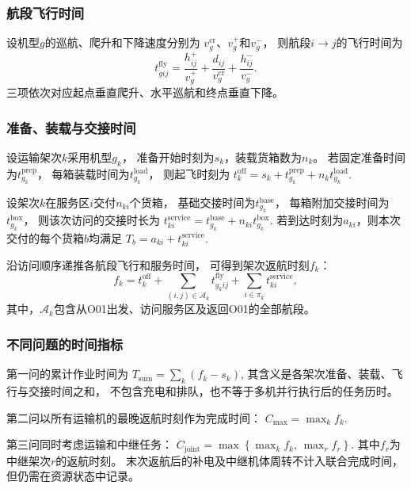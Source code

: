 \documentclass[bwprint]{gmcmthesis}
\begin{document}
\subsubsection{航段飞行时间}

设机型$g$的巡航、爬升和下降速度分别为
$v_g^{\mathrm{cr}}$、$v_g^{+}$和$v_g^{-}$，
则航段$i\to j$的飞行时间为
\begin{equation}
    t_{gij}^{\mathrm{fly}}
    =
    \frac{h_{ij}^{+}}{v_g^{+}}
    +
    \frac{d_{ij}}{v_g^{\mathrm{cr}}}
    +
    \frac{h_{ij}^{-}}{v_g^{-}}.
\end{equation}
三项依次对应起点垂直爬升、水平巡航和终点垂直下降。

\subsubsection{准备、装载与交接时间}

设运输架次$k$采用机型$g_k$，
准备开始时刻为$s_k$，装载货箱数为$n_k$。
若固定准备时间为$t_{g_k}^{\mathrm{prep}}$，
每箱装载时间为$t_{g_k}^{\mathrm{load}}$，
则起飞时刻为
\(t_k^{\mathrm{off}} = s_k+t_{g_k}^{\mathrm{prep}} +n_k t_{g_k}^{\mathrm{load}}\).

设架次$k$在服务区$i$交付$n_{ki}$个货箱，
基础交接时间为$t_{g_k}^{\mathrm{base}}$，
每箱附加交接时间为$t_{g_k}^{\mathrm{box}}$，
则该次访问的交接时长为
\(t_{ki}^{\mathrm{service}} = t_{g_k}^{\mathrm{base}} +n_{ki}t_{g_k}^{\mathrm{box}}\).
若到达时刻为$a_{ki}$，则本次交付的每个货箱$b$均满足
\(T_b = a_{ki}+t_{ki}^{\mathrm{service}}\).

沿访问顺序递推各航段飞行和服务时间，
可得到架次返航时刻$f_k$：
\begin{equation}
    f_k
    =
    t_k^{\mathrm{off}}
    +
    \sum_{(i,j)\in\mathcal{A}_k}
    t_{g_kij}^{\mathrm{fly}}
    +
    \sum_{i\in\pi_k}
    t_{ki}^{\mathrm{service}},
\end{equation}
其中，$\mathcal{A}_k$包含从O01出发、访问服务区及返回O01的全部航段。

\subsubsection{不同问题的时间指标}

第一问的累计作业时间为
\(T_{\mathrm{sum}} = \sum_k(f_k-s_k)\),
其含义是各架次准备、装载、飞行与交接时间之和，
不包含充电和排队，也不等于多机并行执行后的任务历时。

第二问以所有运输机的最晚返航时刻作为完成时间：
\(C_{\max} = \max_k f_k\).

第三问同时考虑运输和中继任务：
\(C_{\mathrm{joint}} = \max\left\{ \max_k f_k,\, \max_r f_r \right\}\).
其中$f_r$为中继架次$r$的返航时刻。
末次返航后的补电及中继机体周转不计入联合完成时间，
但仍需在资源状态中记录。
\end{document}
